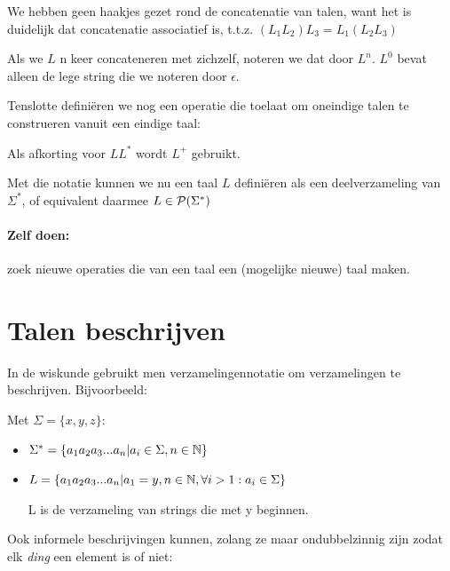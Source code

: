 We hebben geen haakjes gezet rond de concatenatie van talen, want het
is duidelijk dat concatenatie associatief is, t.t.z.
%
$(L_1L_2)L_3 = L_1(L_2L_3)$


Als we $L$ n keer concateneren met zichzelf, noteren we dat door $L^n$.
$L^0$ bevat alleen de lege string die we noteren door $\epsilon$.

Tenslotte defini\"eren we nog een operatie die toelaat om oneindige
talen te construeren vanuit een eindige taal:


Als afkorting voor $LL^*$ wordt $L^+$ gebruikt.

Met die notatie kunnen we nu een taal $L$ defini\"eren als een
deelverzameling van $\Sigma^*$, of equivalent daarmee
%
$ L \in {\cal P}(\Sigma^*)$

\paragraph{Zelf doen:} zoek nieuwe operaties die van een taal een (mogelijke nieuwe) taal maken.

\newpage

\section{Talen beschrijven}


In de wiskunde gebruikt men verzamelingennotatie om verzamelingen te
beschrijven. Bijvoorbeeld:

\begin{vb}
Met $\Sigma = \{x,y,z\}$:
\begin{itemize}
\item 
$\Sigma^* = \{a_1a_2a_3...a_n|a_i \in \Sigma, n \in \mathbb{N} \}$
\item 
$L = \{a_1a_2a_3...a_n|a_1 = y, n \in \mathbb{N}, \forall i > 1: a_i \in \Sigma\}$

L is de verzameling van strings die met y beginnen.
\end{itemize}
\end{vb}




Ook informele beschrijvingen kunnen, zolang ze maar ondubbelzinnig
zijn zodat elk {\em ding} een element is of niet:

